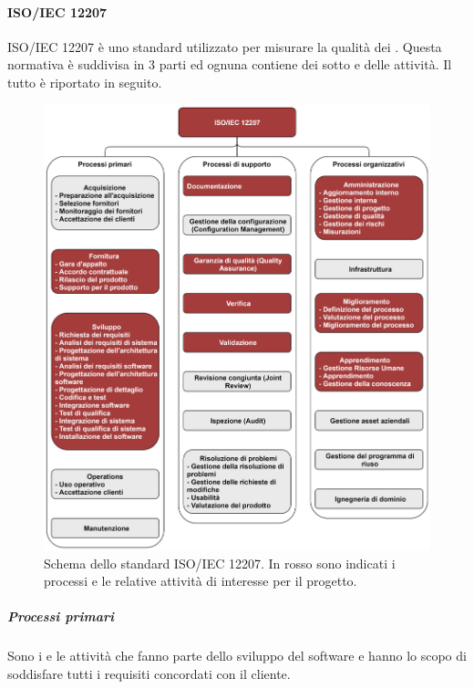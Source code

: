 \paragraph{ISO/IEC 12207}
ISO/IEC 12207 è uno standard utilizzato per misurare la qualità dei . Questa normativa è suddivisa in 3 parti
ed ognuna contiene dei sotto  e delle attività. Il tutto è riportato in seguito. 

\begin{figure}[h!]
    \centering
    \includegraphics[scale=0.53]{Immagini/IsoIec12207.png}
    \caption{Schema dello standard ISO/IEC 12207. In rosso sono indicati i processi e le relative attività di interesse per il progetto.}
\end{figure}

\subparagraph{Processi primari}
Sono i  e le attività che fanno parte dello sviluppo del software e hanno lo scopo di soddisfare tutti i requisiti concordati con il cliente.

